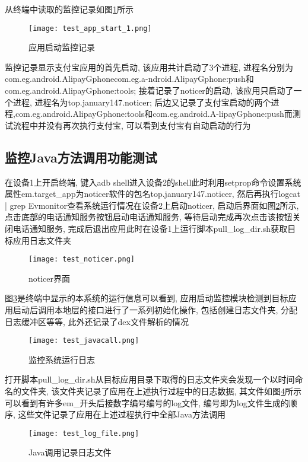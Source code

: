 从终端中读取的监控记录如图\ref{testAppStart1}所示\juhao
\begin{figure}[ht]
	\centering
	\texttt{[image: test\_app\_start\_1.png]}
	\caption{应用启动监控记录}
	\label{testAppStart1}
\end{figure}
监控记录显示支付宝应用的首先启动, 该应用共计启动了3个进程, 进程名分别为com.eg.android.AlipayGphone\dunhao com.eg.a-ndroid.AlipayGphone:push\dunhao 和com.eg.android.AlipayGphone:tools; 接着记录了noticer的启动, 该应用只启动了一个进程, 进程名为top.january147.noticer; 后边又记录了支付宝启动的两个进程,com.eg.android.AlipayGphone:tools和com.eg.android.A-lipayGphone:push而测试流程中并没有再次执行支付宝, 可以看到支付宝有自动启动的行为\juhao 

\subsection{监控Java方法调用功能测试}
\label{testJavacallA}
在设备1上开启终端, 键入adb shell进入设备2的shell\juhao 此时利用setprop命令设置系统属性em.target\_app为noticer软件的包名top.january147.noticer, 然后再执行logcat | grep Evmonitor查看系统运行情况\juhao 在设备2上启动noticer, 启动后界面如图\ref{testNoticer}所示, 点击底部的电话通知服务按钮启动电话通知服务, 等待启动完成再次点击该按钮关闭电话通知服务, 完成后退出应用\juhao 此时在设备1上运行脚本pull\_log\_dir.sh获取目标应用日志文件夹\juhao
\begin{figure}[ht]
	\centering
	\texttt{[image: test\_noticer.png]}
	\caption{noticer界面}
	\label{testNoticer}
\end{figure}

图\ref{testJavacall}是终端中显示的本系统的运行信息\juhao 可以看到, 应用启动监控模块检测到目标应用启动后调用本地层的接口进行了一系列初始化操作, 包括创建日志文件夹, 分配日志缓冲区等等, 此外还记录了dex文件解析的情况\juhao 
\begin{figure}[ht]
	\centering
	\texttt{[image: test\_javacall.png]}
	\caption{监控系统运行日志}
	\label{testJavacall}
\end{figure}

打开脚本pull\_log\_dir.sh从目标应用目录下取得的日志文件夹会发现一个以时间命名的文件夹, 该文件夹记录了应用在上述执行过程中的日志数据, 其文件如图\ref{testLogFile}所示\juhao 可以看到有许多em\_开头后接数字编号编号的log文件, 编号即为log文件生成的顺序, 这些文件记录了应用在上述过程执行中全部Java方法调用\juhao 
\begin{figure}[ht]
	\centering
	\texttt{[image: test\_log\_file.png]}
	\caption{Java调用记录日志文件}
	\label{testLogFile}
\end{figure}

